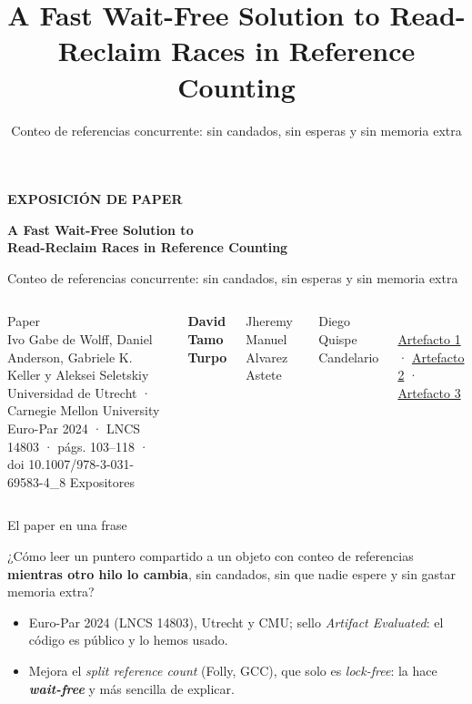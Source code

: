 \documentclass[aspectratio=169,11pt]{beamer}
\title{A Fast Wait-Free Solution to Read-Reclaim Races in Reference Counting}
\subtitle{Conteo de referencias concurrente: sin candados, sin esperas y sin memoria extra}
\date{}
\newcommand{\elexpositor}{}
\newcommand{\expone}[1]{\renewcommand{\elexpositor}{#1}}
\begin{document}
{
\begin{frame}[plain]
  \vspace*{6mm}
  {\color{acento}\small\bfseries EXPOSICIÓN DE PAPER}\par\smallskip
  {\fontsize{24}{28}\selectfont\bfseries A Fast Wait-Free Solution to\\ Read-Reclaim Races in Reference Counting\par}
  \medskip
  {\large\color{gris}Conteo de referencias concurrente: sin candados, sin esperas y sin memoria extra\par}
  \vfill
  \begin{columns}[T]
    {\small\color{gris}Paper}\\
    Ivo Gabe de Wolff, Daniel Anderson, Gabriele K. Keller y Aleksei Seletskiy\\
    {\small Universidad de Utrecht · Carnegie Mellon University}\\
    {\small Euro-Par 2024 · LNCS 14803 · págs. 103–118 · doi 10.1007/978-3-031-69583-4\_8}
    {\small\color{gris}Expositores}\\[2pt]
    {\normalsize\bfseries David Tamo Turpo\par Jheremy Manuel Alvarez Astete\par Diego Quispe Candelario\par}
    \\[2pt]
    {\small\href{https://claude.ai/artifact/YBS98Wz8SmSYWHca2YbHF6}{Artefacto 1} · \href{https://claude.ai/artifact/EQJd2aXZUYVX1Zio4DqFwH}{Artefacto 2} · \href{https://claude.ai/artifact/VVGviffH178bBZ6tGSAnKZ}{Artefacto 3}}
  \end{columns}
  \vspace*{4mm}
\end{frame}}

\expone{David}

\begin{frame}{El paper en una frase}
  \begin{block}{}
    \large ¿Cómo leer un puntero compartido a un objeto con conteo de referencias \textbf{mientras otro hilo lo cambia}, sin candados, sin que nadie espere y sin gastar memoria extra?
  \end{block}
  \bigskip
  \begin{itemize}
    \item Euro-Par 2024 (LNCS 14803), Utrecht y CMU; sello \emph{Artifact Evaluated}: el código es público y lo hemos usado.
    \item Mejora el \emph{split reference count} (Folly, GCC), que solo es \emph{lock-free}: la hace \textbf{\emph{wait-free}} y más sencilla de explicar.
  \end{itemize}
\end{frame}
\end{document}
